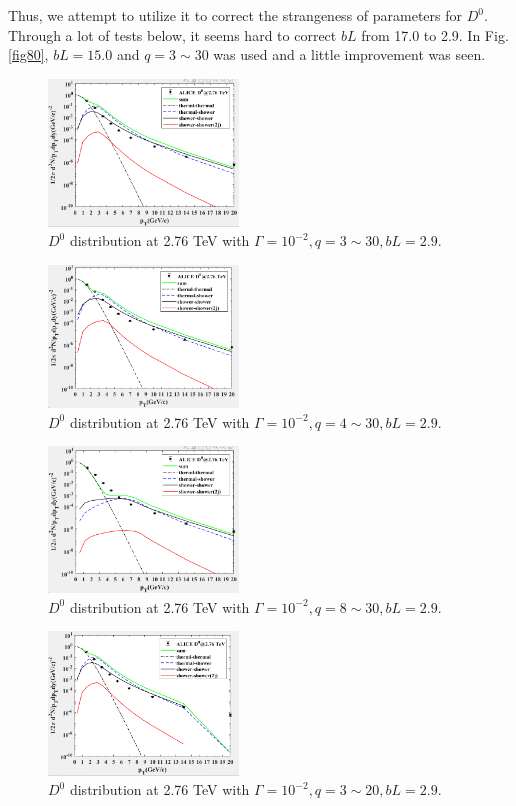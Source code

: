 \documentclass[twocolumn,aps,superscriptaddress,nofootinbib,floatfix]{revtex4}
\begin{document}
Thus, we attempt to utilize it to correct the strangeness of parameters for $D^0$. Through a lot of tests below, it seems hard to correct $bL$ from 17.0 to 2.9. In Fig.\ref{fig80}, $bL=15.0$ and $q=3\sim30$ was used and a little improvement was seen.
\begin{figure}[H]
	\includegraphics[width=0.45\textwidth]{D0276_q330.png}
	\caption{$D^0$ distribution at 2.76 TeV with $\Gamma=10^{-2}, q=3\sim30, bL=2.9$. }
	\label{fig75}
\end{figure}
\begin{figure}[H]
	\includegraphics[width=0.45\textwidth]{D0276_q430.png}
	\caption{$D^0$ distribution at 2.76 TeV with $\Gamma=10^{-2}, q=4\sim30, bL=2.9$. }
	\label{fig76}
\end{figure}
\begin{figure}[H]
	\includegraphics[width=0.45\textwidth]{D0276_q830.png}
	\caption{$D^0$ distribution at 2.76 TeV with $\Gamma=10^{-2}, q=8\sim30, bL=2.9$. }
	\label{fig77}
\end{figure}
 \begin{figure}[H]
 	\includegraphics[width=0.45\textwidth]{D0276_q320.png}
 	\caption{$D^0$ distribution at 2.76 TeV with $\Gamma=10^{-2}, q=3\sim20, bL=2.9$. }
 	\label{fig78}
 \end{figure}
\end{document}
